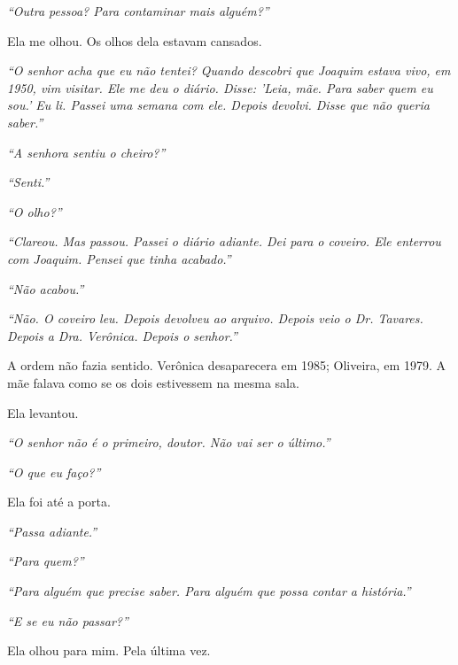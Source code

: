 \noindent \textit{\textquotedblleft{}Outra pessoa? Para contaminar mais alguém?\textquotedblright{}}

\noindent Ela me olhou. Os olhos dela estavam cansados.

\noindent \textit{\textquotedblleft{}O senhor acha que eu não tentei? Quando descobri que Joaquim estava vivo, em 1950, vim visitar. Ele me deu o diário. Disse: 'Leia, mãe. Para saber quem eu sou.' Eu li. Passei uma semana com ele. Depois devolvi. Disse que não queria saber.\textquotedblright{}}

\noindent \textit{\textquotedblleft{}A senhora sentiu o cheiro?\textquotedblright{}}

\noindent \textit{\textquotedblleft{}Senti.\textquotedblright{}}

\noindent \textit{\textquotedblleft{}O olho?\textquotedblright{}}

\noindent \textit{\textquotedblleft{}Clareou. Mas passou. Passei o diário adiante. Dei para o coveiro. Ele enterrou com Joaquim. Pensei que tinha acabado.\textquotedblright{}}

\noindent \textit{\textquotedblleft{}Não acabou.\textquotedblright{}}

\noindent \textit{\textquotedblleft{}Não. O coveiro leu. Depois devolveu ao arquivo. Depois veio o Dr. Tavares. Depois a Dra. Verônica. Depois o senhor.\textquotedblright{}}

\noindent A ordem não fazia sentido. Verônica desaparecera em 1985; Oliveira, em 1979. A mãe falava como se os dois estivessem na mesma sala.

\noindent Ela levantou.

\noindent \textit{\textquotedblleft{}O senhor não é o primeiro, doutor. Não vai ser o último.\textquotedblright{}}

\noindent \textit{\textquotedblleft{}O que eu faço?\textquotedblright{}}

\noindent Ela foi até a porta.

\noindent \textit{\textquotedblleft{}Passa adiante.\textquotedblright{}}

\noindent \textit{\textquotedblleft{}Para quem?\textquotedblright{}}

\noindent \textit{\textquotedblleft{}Para alguém que precise saber. Para alguém que possa contar a história.\textquotedblright{}}

\noindent \textit{\textquotedblleft{}E se eu não passar?\textquotedblright{}}

\noindent Ela olhou para mim. Pela última vez.

